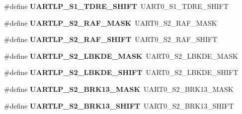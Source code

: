 \begin{DoxyCompactItemize}
\item 
\hypertarget{group___backward___compatibility___symbols_gad1469491e7fcddf3521ef7d5ac86dc04}{}\#define {\bfseries U\+A\+R\+T\+L\+P\+\_\+\+S1\+\_\+\+T\+D\+R\+E\+\_\+\+S\+H\+I\+F\+T}~U\+A\+R\+T0\+\_\+\+S1\+\_\+\+T\+D\+R\+E\+\_\+\+S\+H\+I\+F\+T\label{group___backward___compatibility___symbols_gad1469491e7fcddf3521ef7d5ac86dc04}

\item 
\hypertarget{group___backward___compatibility___symbols_gab739ff1ae228bcdf87973e919ad42c12}{}\#define {\bfseries U\+A\+R\+T\+L\+P\+\_\+\+S2\+\_\+\+R\+A\+F\+\_\+\+M\+A\+S\+K}~U\+A\+R\+T0\+\_\+\+S2\+\_\+\+R\+A\+F\+\_\+\+M\+A\+S\+K\label{group___backward___compatibility___symbols_gab739ff1ae228bcdf87973e919ad42c12}

\item 
\hypertarget{group___backward___compatibility___symbols_ga135975b0721bd170915cd4337759dfd7}{}\#define {\bfseries U\+A\+R\+T\+L\+P\+\_\+\+S2\+\_\+\+R\+A\+F\+\_\+\+S\+H\+I\+F\+T}~U\+A\+R\+T0\+\_\+\+S2\+\_\+\+R\+A\+F\+\_\+\+S\+H\+I\+F\+T\label{group___backward___compatibility___symbols_ga135975b0721bd170915cd4337759dfd7}

\item 
\hypertarget{group___backward___compatibility___symbols_gaa783dcdafc362c97d89deca6d87ad1e0}{}\#define {\bfseries U\+A\+R\+T\+L\+P\+\_\+\+S2\+\_\+\+L\+B\+K\+D\+E\+\_\+\+M\+A\+S\+K}~U\+A\+R\+T0\+\_\+\+S2\+\_\+\+L\+B\+K\+D\+E\+\_\+\+M\+A\+S\+K\label{group___backward___compatibility___symbols_gaa783dcdafc362c97d89deca6d87ad1e0}

\item 
\hypertarget{group___backward___compatibility___symbols_gace59d2986627e12405c737f49513fa0c}{}\#define {\bfseries U\+A\+R\+T\+L\+P\+\_\+\+S2\+\_\+\+L\+B\+K\+D\+E\+\_\+\+S\+H\+I\+F\+T}~U\+A\+R\+T0\+\_\+\+S2\+\_\+\+L\+B\+K\+D\+E\+\_\+\+S\+H\+I\+F\+T\label{group___backward___compatibility___symbols_gace59d2986627e12405c737f49513fa0c}

\item 
\hypertarget{group___backward___compatibility___symbols_ga4ae8233f1781ea7dc494fc5eff1262df}{}\#define {\bfseries U\+A\+R\+T\+L\+P\+\_\+\+S2\+\_\+\+B\+R\+K13\+\_\+\+M\+A\+S\+K}~U\+A\+R\+T0\+\_\+\+S2\+\_\+\+B\+R\+K13\+\_\+\+M\+A\+S\+K\label{group___backward___compatibility___symbols_ga4ae8233f1781ea7dc494fc5eff1262df}

\item 
\hypertarget{group___backward___compatibility___symbols_ga43368a6f820ea82d1ee803cf7e94c5b1}{}\#define {\bfseries U\+A\+R\+T\+L\+P\+\_\+\+S2\+\_\+\+B\+R\+K13\+\_\+\+S\+H\+I\+F\+T}~U\+A\+R\+T0\+\_\+\+S2\+\_\+\+B\+R\+K13\+\_\+\+S\+H\+I\+F\+T\label{group___backward___compatibility___symbols_ga43368a6f820ea82d1ee803cf7e94c5b1}


\end{DoxyCompactItemize}
